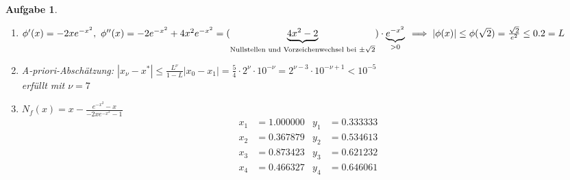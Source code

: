\documentclass[11pt]{article}
\theoremstyle{break}
\newtheorem{task}{Aufgabe}
\newcommand{\abs}[1]{\ensuremath{\left\vert #1 \right\vert}}
\begin{document}
\begin{task}
    \hfill\vspace{-5mm}
    \begin{enumerate}[label={(\alph*)}]
        \item $\phi'(x) = -2x e^{-x^2},\ \phi''(x) = -2e^{-x^2} + 4x^2 e^{-x^2} = (\underbrace{4x^2-2}_{\text{Nullstellen und Vorzeichenwechsel bei } \pm \sqrt{2}})\cdot \underbrace{e^{-x^2}}_{>0}\\\implies \abs{\phi(x)}\leq\phi(\sqrt{2}) = \frac{\sqrt{2}}{e^2} \leq 0.2 = L$
        \item \textit{A-priori-Abschätzung:} $\abs{x_\nu-x^*}\leq\frac{L^\nu}{1-L}\abs{x_0-x_1} = \frac{5}{4}\cdot 2^\nu\cdot 10^{-\nu} = 2^{\nu-3}\cdot 10^{-\nu+1} < 10^{-5}$\\
        erfüllt mit $\nu=7$
        \item $N_f(x) = x - \frac{e^{-x^2}-x}{-2xe^{-x^2}-1}$
        \begin{align*}
            x_1 &= 1.000000 & y_1 &= 0.333333\\
            x_2 &= 0.367879 & y_2 &= 0.534613\\
            x_3 &= 0.873423 & y_3 &= 0.621232\\
            x_4 &= 0.466327 & y_4 &= 0.646061
        \end{align*}
    \end{enumerate}
\end{task}
\end{document}

